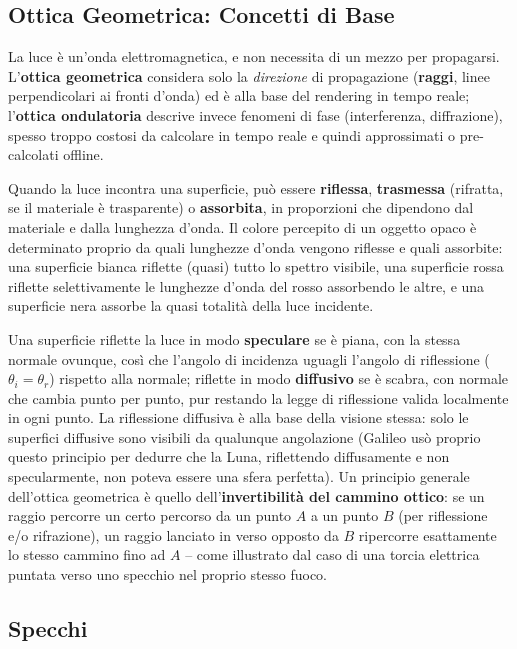 \documentclass[a4paper,11pt]{article}
\begin{document}
\subsection{Ottica Geometrica: Concetti di Base}

La luce è un'onda elettromagnetica, e non necessita di un mezzo per propagarsi. L'\textbf{ottica geometrica} considera solo la \emph{direzione} di propagazione (\textbf{raggi}, linee perpendicolari ai fronti d'onda) ed è alla base del rendering in tempo reale; l'\textbf{ottica ondulatoria} descrive invece fenomeni di fase (interferenza, diffrazione), spesso troppo costosi da calcolare in tempo reale e quindi approssimati o pre-calcolati offline.

Quando la luce incontra una superficie, può essere \textbf{riflessa}, \textbf{trasmessa} (rifratta, se il materiale è trasparente) o \textbf{assorbita}, in proporzioni che dipendono dal materiale e dalla lunghezza d'onda. Il colore percepito di un oggetto opaco è determinato proprio da quali lunghezze d'onda vengono riflesse e quali assorbite: una superficie bianca riflette (quasi) tutto lo spettro visibile, una superficie rossa riflette selettivamente le lunghezze d'onda del rosso assorbendo le altre, e una superficie nera assorbe la quasi totalità della luce incidente.

Una superficie riflette la luce in modo \textbf{speculare} se è piana, con la stessa normale ovunque, così che l'angolo di incidenza uguagli l'angolo di riflessione ($\theta_i=\theta_r$) rispetto alla normale; riflette in modo \textbf{diffusivo} se è scabra, con normale che cambia punto per punto, pur restando la legge di riflessione valida localmente in ogni punto. La riflessione diffusiva è alla base della visione stessa: solo le superfici diffusive sono visibili da qualunque angolazione (Galileo usò proprio questo principio per dedurre che la Luna, riflettendo diffusamente e non specularmente, non poteva essere una sfera perfetta). Un principio generale dell'ottica geometrica è quello dell'\textbf{invertibilità del cammino ottico}: se un raggio percorre un certo percorso da un punto $A$ a un punto $B$ (per riflessione e/o rifrazione), un raggio lanciato in verso opposto da $B$ ripercorre esattamente lo stesso cammino fino ad $A$ -- come illustrato dal caso di una torcia elettrica puntata verso uno specchio nel proprio stesso fuoco.

\subsection{Specchi}
\end{document}
